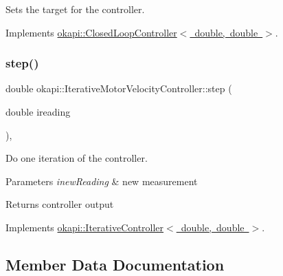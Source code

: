 Sets the target for the controller. 

Implements \mbox{\hyperlink{classokapi_1_1ClosedLoopController_ac14482d0768b3f157d52e0214a4c36d7}{okapi\+::\+Closed\+Loop\+Controller$<$ double, double $>$}}.

\mbox{\label{classokapi_1_1IterativeMotorVelocityController_a71f514d22293dc2e23de26ecd994d57c}} 
\subsubsection{\texorpdfstring{step()}{step()}}
{\footnotesize\ttfamily double okapi\+::\+Iterative\+Motor\+Velocity\+Controller\+::step (\begin{DoxyParamCaption}\item[{double}]{ireading }\end{DoxyParamCaption})\hspace{0.3cm}{\ttfamily [override]}, {\ttfamily [virtual]}}

Do one iteration of the controller.


\begin{DoxyParams}{Parameters}
{\em inew\+Reading} & new measurement \\
\hline
\end{DoxyParams}
\begin{DoxyReturn}{Returns}
controller output 
\end{DoxyReturn}


Implements \mbox{\hyperlink{classokapi_1_1IterativeController_a751bcad1407099e629e3ffbe395daf2b}{okapi\+::\+Iterative\+Controller$<$ double, double $>$}}.



\subsection{Member Data Documentation}
\mbox{\label{classokapi_1_1IterativeMotorVelocityController_a77872f2c9391330ce05e0e356922a396}} 
